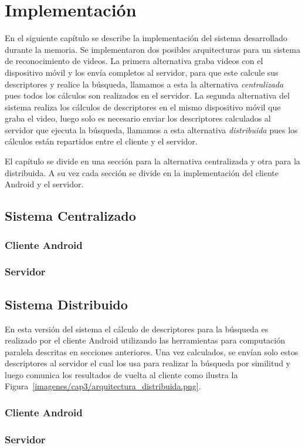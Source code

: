 \chapter{Implementación}
En el siguiente capítulo se describe la implementación del sistema desarrollado durante la memoria. Se implementaron dos posibles arquitecturas para un sistema de reconocimiento de videos. La primera alternativa graba videos con el dispositivo móvil y los envía completos al servidor, para que este calcule sus descriptores y realice la búsqueda, llamamos a esta la alternativa \emph{centralizada} pues todos los cálculos son realizados en el servidor. La segunda alternativa del sistema realiza los cálculos de descriptores en el mismo dispositivo móvil que graba el video, luego solo es necesario enviar los descriptores calculados al servidor que ejecuta la búsqueda, llamamos a esta alternativa \emph{distribuida} pues los cálculos están repartidos entre el cliente y el servidor.

El capítulo se divide en una sección para la alternativa centralizada y otra para la distribuida. A su vez cada sección se divide en la implementación del cliente Android y el servidor.


\section{Sistema Centralizado}
\subsection{Cliente Android}
\subsection{Servidor}
\section{Sistema Distribuido}
En esta versión del sistema el cálculo de descriptores para la búsqueda es realizado por el cliente Android utilizando las herramientas para computación paralela descritas en secciones anteriores. Una vez calculados, se envían solo estos descriptores al servidor el cual los usa para realizar la búsqueda por similitud y luego comunica los resultados de vuelta al cliente como ilustra la Figura~\ref{imagenes/cap3/arquitectura_distribuida.png}. 

\subsection{Cliente Android}
\subsection{Servidor}
